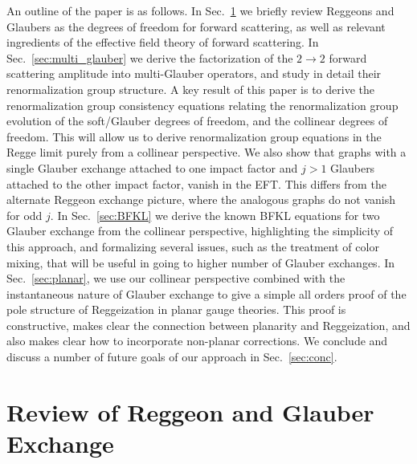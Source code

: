 \documentclass[letterpaper,11pt]{article}
\DeclareRobustCommand{\Sec}[1]{Sec.~\ref{#1}}
\begin{document}
An outline of the paper is as follows. In \Sec{sec:reviewRandG} we briefly review Reggeons and Glaubers as the degrees of freedom for forward scattering, as well as relevant ingredients of the effective field theory of forward scattering.
In \Sec{sec:multi_glauber} we derive the factorization of the $2\to 2$ forward scattering amplitude into multi-Glauber operators, and study in detail their renormalization group structure. A key result of this paper is to derive the renormalization group consistency equations relating the renormalization group evolution of the soft/Glauber degrees of freedom, and the collinear degrees of freedom. This will allow us to derive renormalization group equations in the Regge limit purely from a collinear perspective. We also show that graphs with a single Glauber exchange attached to one impact factor and $j>1$ Glaubers attached to the other impact factor, vanish in the EFT. This differs from the alternate Reggeon exchange picture, where the analogous graphs do not vanish for odd $j$.
%
In \Sec{sec:BFKL} we derive the known BFKL equations for two Glauber exchange from the collinear perspective, highlighting the simplicity of this approach, and formalizing several issues, such as the treatment of color mixing, that will be useful in going to higher number of Glauber exchanges.
%
In \Sec{sec:planar}, we use our collinear perspective combined with the instantaneous nature of Glauber exchange to give a simple all orders proof of the pole structure of Reggeization in planar gauge theories. This proof is constructive, makes clear the connection between planarity and Reggeization, and also makes clear how to incorporate non-planar corrections. 
%
We conclude and discuss a number of future goals of our approach in \Sec{sec:conc}.


\section{Review of Reggeon and Glauber Exchange}
\label{sec:reviewRandG}
\end{document}
